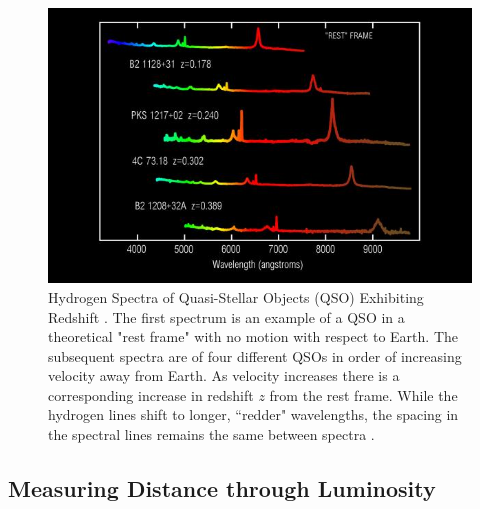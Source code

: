 \begin{figure}[t]
	\centering
	\includegraphics[width=\textwidth]{redshift}
	\caption{Hydrogen Spectra of Quasi-Stellar Objects (QSO) Exhibiting Redshift \cite{SpectralRedshift}. The first spectrum is an example of a QSO in a theoretical "rest frame" with no motion with respect to Earth. The subsequent spectra are of four different QSOs in order of increasing velocity away from Earth. As velocity increases there is a corresponding increase in redshift $z$ from the rest frame. While the hydrogen lines shift to longer, ``redder" wavelengths, the spacing in the spectral lines remains the same between spectra \cite{SpectralRedshift}.}
	\label{fig:redshift}
\end{figure}

\subsection{Measuring Distance through Luminosity}


